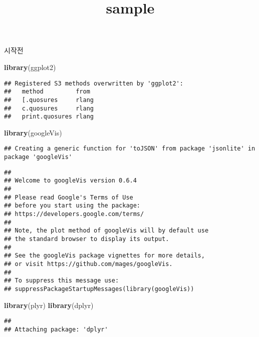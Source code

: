\documentclass[]{article}
\title{sample}
\author{}
\date{}
\newenvironment{Shaded}{\begin{snugshade}}{\end{snugshade}}
\newcommand{\KeywordTok}[1]{\textcolor[rgb]{0.13,0.29,0.53}{\textbf{#1}}}
\newcommand{\NormalTok}[1]{#1}
\begin{document}
\maketitle

시작전

\begin{Shaded}
\begin{Highlighting}[]
\KeywordTok{library}\NormalTok{(ggplot2)}
\end{Highlighting}
\end{Shaded}

\begin{verbatim}
## Registered S3 methods overwritten by 'ggplot2':
##   method         from 
##   [.quosures     rlang
##   c.quosures     rlang
##   print.quosures rlang
\end{verbatim}

\begin{Shaded}
\begin{Highlighting}[]
\KeywordTok{library}\NormalTok{(googleVis)}
\end{Highlighting}
\end{Shaded}

\begin{verbatim}
## Creating a generic function for 'toJSON' from package 'jsonlite' in package 'googleVis'
\end{verbatim}

\begin{verbatim}
## 
## Welcome to googleVis version 0.6.4
## 
## Please read Google's Terms of Use
## before you start using the package:
## https://developers.google.com/terms/
## 
## Note, the plot method of googleVis will by default use
## the standard browser to display its output.
## 
## See the googleVis package vignettes for more details,
## or visit https://github.com/mages/googleVis.
## 
## To suppress this message use:
## suppressPackageStartupMessages(library(googleVis))
\end{verbatim}

\begin{Shaded}
\begin{Highlighting}[]
\KeywordTok{library}\NormalTok{(plyr)}
\KeywordTok{library}\NormalTok{(dplyr)}
\end{Highlighting}
\end{Shaded}

\begin{verbatim}
## 
## Attaching package: 'dplyr'
\end{verbatim}
\end{document}
